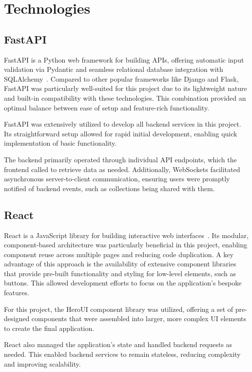 \section{Technologies}
\subsection{FastAPI}
FastAPI is a Python web framework for building APIs, offering automatic input validation via Pydantic and seamless relational database integration with SQLAlchemy~\cite{FastAPI}. Compared to other popular frameworks like Django and Flask, FastAPI was particularly well-suited for this project due to its lightweight nature and built-in compatibility with these technologies. This combination provided an optimal balance between ease of setup and feature-rich functionality.

FastAPI was extensively utilized to develop all backend services in this project. Its straightforward setup allowed for rapid initial development, enabling quick implementation of basic functionality.

The backend primarily operated through individual API endpoints, which the frontend called to retrieve data as needed. Additionally, WebSockets facilitated asynchronous server-to-client communication, ensuring users were promptly notified of backend events, such as collections being shared with them.

\subsection{React}
React is a JavaScript library for building interactive web interfaces~\cite{React}. Its modular, component-based architecture was particularly beneficial in this project, enabling component reuse across multiple pages and reducing code duplication. A key advantage of this approach is the availability of extensive component libraries that provide pre-built functionality and styling for low-level elements, such as buttons. This allowed development efforts to focus on the application's bespoke features.

For this project, the HeroUI component library was utilized, offering a set of pre-designed components that were assembled into larger, more complex UI elements to create the final application.

React also managed the application's state and handled backend requests as needed. This enabled backend services to remain stateless, reducing complexity and improving scalability.

